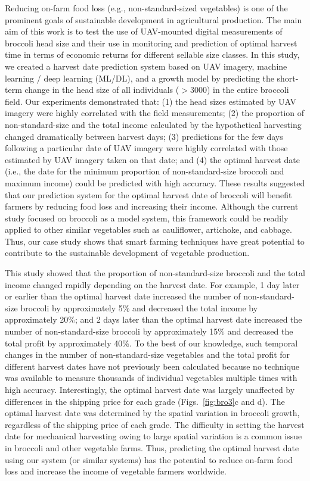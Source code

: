 Reducing on-farm food loss (e.g., non-standard-sized vegetables) is one of the prominent goals of sustainable development in agricultural production. The main aim of this work is to test the use of UAV-mounted digital measurements of broccoli head size and their use in monitoring and prediction of optimal harvest time in terms of economic returns for different sellable size classes. In this study, we created a harvest date prediction system based on UAV imagery, machine learning / deep learning (ML/DL), and a growth model by predicting the short-term change in the head size of all individuals ($> 3000$) in the entire broccoli field. Our experiments demonstrated that: (1) the head sizes estimated by UAV imagery were highly correlated with the field measurements; (2) the proportion of non-standard-size and the total income calculated by the hypothetical harvesting changed dramatically between harvest days; (3) predictions for the few days following a particular date of UAV imagery were highly correlated with those estimated by UAV imagery taken on that date; and (4) the optimal harvest date (i.e., the date for the minimum proportion of non-standard-size broccoli and maximum income) could be predicted with high accuracy. These results suggested that our prediction system for the optimal harvest date of broccoli will benefit farmers by reducing food loss and increasing their income. Although the current study focused on broccoli as a model system, this framework could be readily applied to other similar vegetables such as cauliflower, artichoke, and cabbage. Thus, our case study shows that smart farming techniques have great potential to contribute to the sustainable development of vegetable production.

This study showed that the proportion of non-standard-size broccoli and the total income changed rapidly depending on the harvest date. For example, 1 day later or earlier than the optimal harvest date increased the number of non-standard-size broccoli by approximately 5\% and decreased the total income by approximately 20\%; and 2 days later than the optimal harvest date increased the number of non-standard-size broccoli by approximately 15\% and decreased the total profit by approximately 40\%. To the best of our knowledge, such temporal changes in the number of non-standard-size vegetables and the total profit for different harvest dates have not previously been calculated because no technique was available to measure thousands of individual vegetables multiple times with high accuracy. Interestingly, the optimal harvest date was largely unaffected by differences in the shipping price for each grade (Figs.~\ref{fig:bro3}c and d). The optimal harvest date was determined by the spatial variation in broccoli growth, regardless of the shipping price of each grade. The difficulty in setting the harvest date for mechanical harvesting owing to large spatial variation is a common issue in broccoli and other vegetable farms. Thus, predicting the optimal harvest date using our system (or similar systems) has the potential to reduce on-farm food loss and increase the income of vegetable farmers worldwide.


